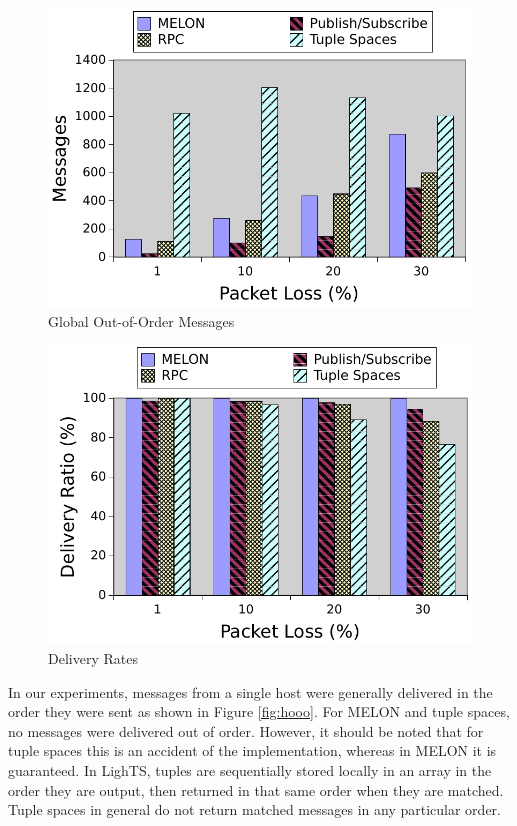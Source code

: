 \begin{figure}
\centering
\includegraphics[width = \textwidth]{figures/gooo.pdf}
\caption{Global Out-of-Order Messages}
\label{fig:gooo}
\end{figure}

\begin{figure}
\centering
\includegraphics[width = \textwidth]{figures/delivery.pdf}
\caption{Delivery Rates}
\label{fig:delivery}
\end{figure}

In our experiments, messages from a single host were generally delivered in the order they were sent as shown in Figure \ref{fig:hooo}. For MELON and tuple spaces, no messages were delivered out of order. However, it should be noted that for tuple spaces this is an accident of the implementation, whereas in MELON it is guaranteed. In LighTS, tuples are sequentially stored locally in an array in the order they are output, then returned in that same order when they are matched. Tuple spaces in general do not return matched messages in any particular order.

